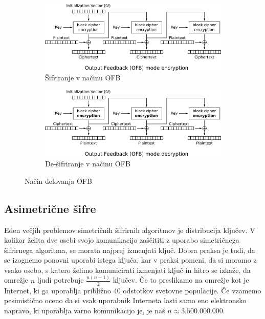 \documentclass[12pt,a4paper,openany]{book}
\begin{document}
\begin{figure}[ht!]
  \centering
  \begin{subfigure}[b]{\textwidth}
    \includegraphics[width=\textwidth]{images/OFB_encryption}
    \caption{Šifriranje v načinu OFB}
\label{fig:ofbenc}
  \end{subfigure}
  \begin{subfigure}[b]{\textwidth}
    \includegraphics[width=\textwidth]{images/OFB_decryption}
    \caption{De-šifriranje v načinu OFB}
\label{fig:ofbdec}
  \end{subfigure}
  \caption{Način delovanja \gls{OFB}}
\label{fig:ofbmode}
\end{figure}



\subsection{Asimetrične šifre}

Eden večjih problemov simetričnih šifrirnih algoritmov je distribucija ključev. V kolikor želita dve osebi svojo komunikacijo zaščititi z uporabo simetričnega šifrirnega algoritma, se morata najprej izmenjati ključ. Dobra praksa je tudi, da se izognemo ponovni uporabi istega ključa, kar v praksi pomeni, da si moramo z vsako osebo, s katero želimo komunicirati izmenjati ključ in hitro se izkaže, da omrežje $n$ ljudi potrebuje $\frac{n(n-1)}{2}$ ključev. Če to preslikamo na omrežje kot je Internet, ki ga uporablja približno 40 odstotkov svetovne populacije. Če vzamemo pesimistično oceno da si vsak uporabnik Interneta lasti samo eno elektronsko napravo, ki uporablja varno komunikacijo je, je naš $n \approx 3.500.000.000$.
\end{document}
